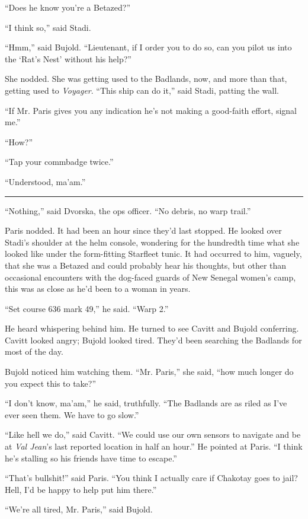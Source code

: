 \documentclass[twoside,letterpaper,12pt]{memoir}
\begin{document}
``Does he know you're a Betazed?''

``I think so,'' said Stadi.

``Hmm,'' said Bujold. ``Lieutenant, if I order you to do so, can you pilot us into the ‘Rat’s Nest’ without his help?''

She nodded. She was getting used to the Badlands, now, and more than that, getting used to \textit{Voyager}. ``This ship can do it,'' said Stadi, patting the wall.

``If Mr. Paris gives you any indication he's not making a good-faith effort, signal me.''

``How?''

``Tap your commbadge twice.''

``Understood, ma'am.''

\fancybreak{\rule{3cm}{0.4 pt}}
``Nothing,'' said Dvorska, the ops officer. ``No debris, no warp trail.''

Paris nodded. It had been an hour since they'd last stopped. He looked over Stadi's shoulder at the helm console, wondering for the hundredth time what she looked like under the form-fitting Starfleet tunic. It had occurred to him, vaguely, that she was a Betazed and could probably hear his thoughts, but other than occasional encounters with the dog-faced guards of New Senegal women's camp, this was as close as he'd been to a woman in years.

``Set course 636 mark 49,'' he said. ``Warp 2.''

He heard whispering behind him. He turned to see Cavitt and Bujold conferring. Cavitt looked angry; Bujold looked tired. They'd been searching the Badlands for most of the day.

Bujold noticed him watching them. ``Mr. Paris,'' she said, ``how much longer do you expect this to take?''

``I don't know, ma'am,'' he said, truthfully. ``The Badlands are as riled as I've ever seen them. We have to go slow.''

``Like hell we do,'' said Cavitt. ``We could use our own sensors to navigate and be at \textit{Val Jean}'s last reported location in half an hour.'' He pointed at Paris. ``I think he’s stalling so his friends have time to escape.''

``That's bullshit!'' said Paris. ``You think I actually care if Chakotay goes to jail? Hell, I'd be happy to help put him there.''

``We're all tired, Mr. Paris,'' said Bujold.
\end{document}
